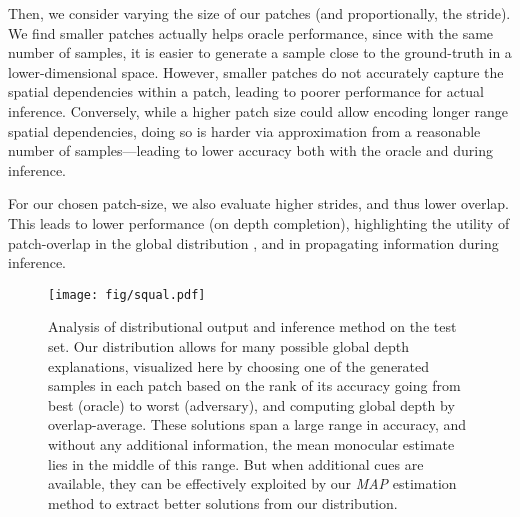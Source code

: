 \documentclass[10pt,twocolumn,letterpaper]{article}
\begin{document}
Then, we consider varying the size of our patches (and proportionally, the stride). We find smaller patches actually helps oracle performance, since with the same number of samples, it is easier to generate a sample close to the ground-truth in a lower-dimensional space. However, smaller patches do not accurately capture the spatial dependencies within a patch, leading to poorer performance for actual inference. Conversely, while a higher patch size could allow encoding longer range spatial dependencies, doing so is harder via approximation from a reasonable number of samples---leading to lower accuracy both with the oracle and during inference.

For our chosen patch-size, we also evaluate higher strides, and thus lower overlap. This leads to lower performance (on depth completion), highlighting the utility of patch-overlap in the global distribution , and in propagating information during inference.


\begin{figure}[!t]
  \centering
  \texttt{[image: fig/squal.pdf]}
  \caption{Analysis of distributional output and inference method on the test set. Our distribution allows for many possible global depth explanations, visualized here by choosing one of the generated samples in each patch based on the rank of its accuracy going from best (oracle) to worst (adversary), and computing global depth by overlap-average. These solutions span a large range in accuracy, and without any additional information, the mean monocular estimate lies in the middle of this range. But when additional cues are available, they can be effectively exploited by our \emph{MAP} estimation method to extract better solutions from our distribution.}
  \label{fig:squal}
\end{figure}
\end{document}
